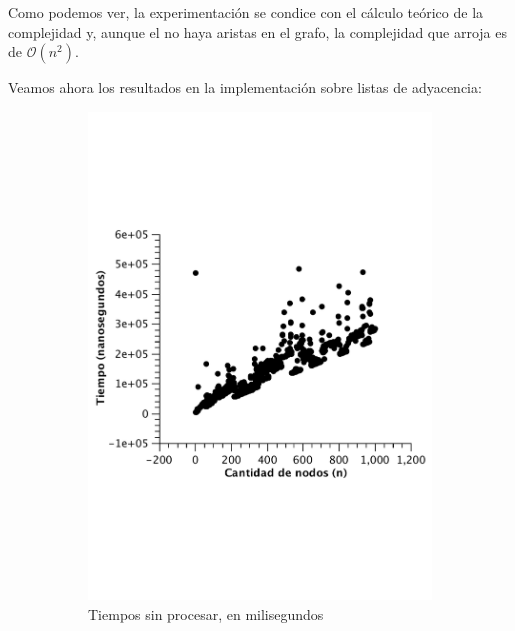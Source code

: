 Como podemos ver, la experimentación se condice con el cálculo teórico de la complejidad y, aunque el no haya aristas en el grafo, la complejidad que arroja es de $\mathcal{O}(n^2)$.


Veamos ahora los resultados en la implementación sobre listas de adyacencia:

\begin{figure}[H]
        \centering
\begin{subfigure}[b]{0.45\textwidth}
                \includegraphics[width=\textwidth]{imagenes/vacio-listas-1.pdf}
                \caption{Tiempos sin procesar, en milisegundos}
        \end{subfigure}%
        \begin{subfigure}[b]{0.45\textwidth}

\end{subfigure}
\end{figure}
